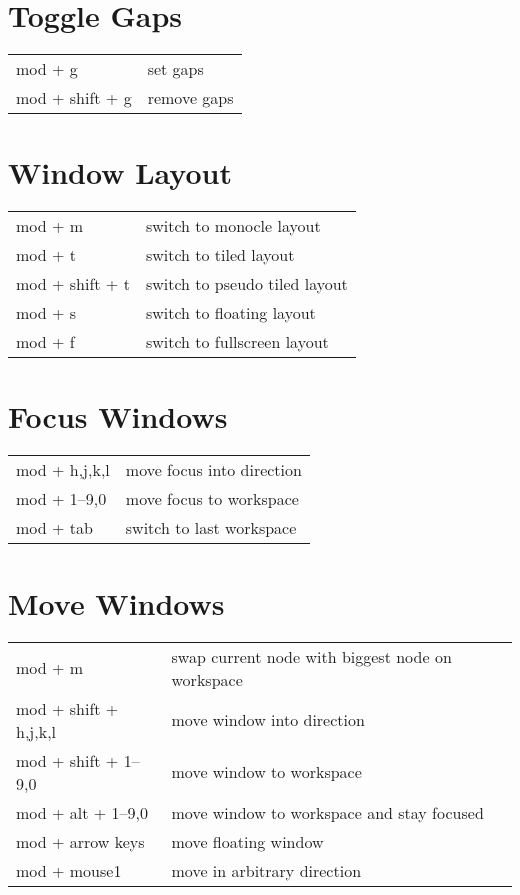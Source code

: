 \documentclass[
    10pt,
    a4paper,
    notitlepage,
    egregdoesnotlikesansseriftitles
]{scrartcl}
\begin{document}
\section{Toggle Gaps}
\begin{tabular}{p{4cm}l}
    mod + g             & set gaps                              \\
    mod + shift + g     & remove gaps
\end{tabular}

\section{Window Layout}
\begin{tabular}{p{4cm}l}
    mod + m             & switch to monocle layout              \\
    mod + t             & switch to tiled layout                \\
    mod + shift + t     & switch to pseudo tiled layout         \\
    mod + s             & switch to floating layout             \\
    mod + f             & switch to fullscreen layout
\end{tabular}

\section{Focus Windows}
\begin{tabular}{p{4cm}l}
    mod + h,j,k,l         & move focus into direction        \\
    mod + 1--9,0          & move focus to workspace         \\
    mod + tab             & switch to last workspace
\end{tabular}

\section{Move Windows}
\begin{tabular}{p{4cm}l}
    mod + m               & swap current node with biggest node on workspace \\
    mod + shift + h,j,k,l & move window into direction        \\
    mod + shift + 1--9,0   & move window to workspace         \\
    mod + alt + 1--9,0     & move window to workspace and stay focused       \\
    mod + arrow keys      & move floating window              \\
    mod + mouse1          & move in arbitrary direction
\end{tabular}
\end{document}
